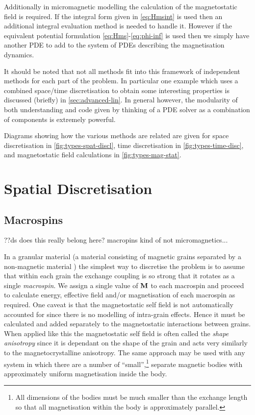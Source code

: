 Additionally in micromagnetic modelling the calculation of the magnetostatic field is required.
If the integral form given in \eqref{eq:Hmsint} is used then an additional integral evaluation method is needed to handle it.
However if the equivalent potential formulation \eqref{eq:Hms}-\eqref{eq:phi-inf} is used then we simply have another PDE to add to the system of PDEs describing the magnetisation dynamics.

It should be noted that not all methods fit into this framework of independent methods for each part of the problem.
In particular one example which uses a combined space/time discretisation to obtain some interesting properties is discussed (briefly) in \autoref{sec:advanced-lin}.
In general however, the modularity of both understanding and code given by thinking of a PDE solver as a combination of components is extremely powerful.

Diagrams showing how the various methods are related are given for space discretisation in \autoref{fig:types-spat-discl}, time discretisation in \autoref{fig:types-time-disc}, and magnetostatic field calculations in \autoref{fig:types-mag-stat}.


\section{Spatial Discretisation}
\label{sec:spat-discr}

\subsection{Macrospins}
\label{sec:sd-macrospins}

??ds does this really belong here? macropins kind of not micromagnetics...

In a granular material (a material consisting of magnetic grains separated by a non-magnetic material%
) the simplest way to discretise the problem is to assume that within each grain the exchange coupling is so strong that it rotates as a single \emph{macrospin}. We assign a single value of $\mathbf{M}$ to each macrospin and proceed to calculate energy, effective field and/or magnetisation of each macrospin as required. One caveat is that the magnetostatic self field is not automatically accounted for since there is no modelling of intra-grain effects. Hence it must be calculated and added separately to the magnetostatic interactions between grains. When applied like this the magnetostatic self field is often called the \emph{shape anisotropy} since it is dependant on the shape of the grain and acts very similarly to the magnetocrystalline anisotropy. The same approach may be used with any system in which there are a number of ``small'',\footnote{All dimensions of the bodies must be much smaller than the exchange length so that all magnetisation within the body is approximately parallel.} separate magnetic bodies with approximately uniform magnetisation inside the body.

